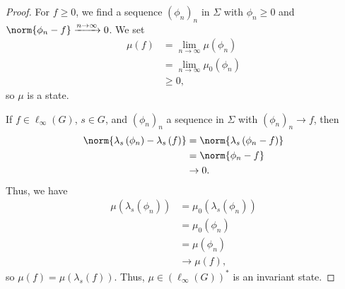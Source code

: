 \begin{proof}
  For $f\geq 0$, we find a sequence $\left(\phi_n\right)_n$ in $\Sigma$ with $\phi_n\geq 0$ and $\norm{\phi_n - f} \xrightarrow{n\rightarrow\infty}0$. We set
  \begin{align*}
    \mu\left(f\right) &= \lim_{n\rightarrow\infty}\mu\left(\phi_n\right)\\
                      &= \lim_{n\rightarrow\infty}\mu_0\left(\phi_n\right)\\
                      &\geq 0,
  \end{align*}
  so $\mu$ is a state.\newline

  If $f\in \ell_{\infty}\left(G\right)$, $s\in G$, and $\left(\phi_n\right)_n$ a sequence in $\Sigma$ with $\left(\phi_n\right)_n\rightarrow f$, then
  \begin{align*}
    \norm{\lambda_s\left(\phi_n\right) - \lambda_s\left(f\right)} &= \norm{\lambda_s\left(\phi_n - f\right)}\\
                                                                  &= \norm{\phi_n - f}\\
                                                                  &\rightarrow 0.
  \end{align*}
  Thus, we have
  \begin{align*}
    \mu\left(\lambda_s\left(\phi_n\right)\right) &= \mu_0\left(\lambda_s\left(\phi_n\right)\right)\\
                                                 &= \mu_0\left(\phi_n\right)\\
                                                 &= \mu\left(\phi_n\right)\\
                                                 &\rightarrow \mu\left(f\right),
  \end{align*}
  so $\mu\left(f\right) = \mu\left(\lambda_s\left(f\right)\right)$. Thus, $\mu\in \left(\ell_{\infty}\left(G\right)\right)^{\ast}$ is an invariant state.
\end{proof}
